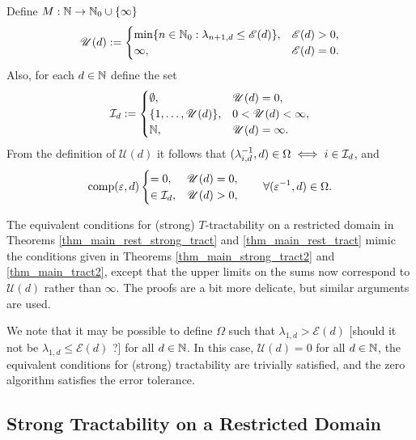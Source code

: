 \documentclass[sort&compress]{elsarticle}
\newcommand{\theM}{\mathscr{E}}
\newcommand{\theUB}{\mathscr{U}}
\renewcommand{\hI}{\ci}
\newcommand{\peter}[1]{\begingroup\color{purple}#1\endgroup}
\begin{document}
Define $M: \mathbb{N} \to \mathbb{N}_{0} \cup \{\infty\}$
\begin{equation} \label{eq:Mddef}
    \theUB(d) := \begin{cases}
        \min\{n \in \natzero : \lambda_{n+1,d} \le \theM(d)\}, & \theM(d) > 0, \\
        \infty, & \theM(d) = 0.
    \end{cases}
\end{equation}
Also, for each $d \in \mathbb{N}$ define the \peter{set}
\begin{equation} \label{eq:hIdef}
\hI_{d}:=\begin{cases} 
\emptyset, & \theUB(d) = 0, \\
\{1,\ldots, \theUB(d)\}, & 0 < \theUB(d) < \infty, \\
\naturals, & \theUB(d) = \infty.
\end{cases}
\end{equation}
From the definition of $\theUB(d)$ it follows that $(\lambda_{i,d}^{-1},d) \in \Omega  \iff i \in \hI_d$, and
\begin{equation} \label{eq:comprestr}
  \comp(\varepsilon,d) \begin{cases}
= 0, & \theUB(d) = 0, \\
    \in \hI_d, & \theUB(d) > 0, 
\end{cases}
\qquad \forall (\varepsilon^{-1},d) \in \Omega.
\end{equation}


The equivalent conditions for (strong) $T$-tractability on a restricted domain in Theorems \ref{thm_main_rest_strong_tract} and \ref{thm_main_rest_tract} mimic the conditions given in Theorems \ref{thm_main_strong_tract2} and \ref{thm_main_tract2}, except that the upper limits on the sums now correspond to $\theUB(d)$ rather than $\infty$.  The proofs are a bit more delicate, but similar arguments are used.  

We note that it may be possible to define $\Omega$ such that $\lambda_{1,d} > \theM(d)$ 
\peter{[should it not be $\lambda_{1,d} \le \theM(d)$ ?]}
for all $d \in \mathbb{N}$. In this case, $\theUB(d) = 0$ for all $d \in \mathbb{N}$, the equivalent conditions for (strong) tractability are trivially satisfied, and the zero algorithm satisfies the error tolerance.

\subsection{Strong Tractability on a Restricted Domain}
\end{document}
